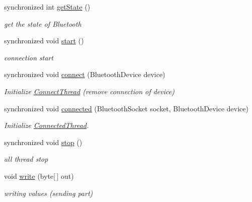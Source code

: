 \begin{DoxyCompactItemize}
synchronized int \mbox{\hyperlink{classhi_1_1world_1_1hello_1_1myapplication_1_1_bluetooth_service_aa33057afe9bc035501a9db0cd842d0d3}{get\+State}} ()
\begin{DoxyCompactList}\small\item\em get the state of Bluetooth \end{DoxyCompactList}\item 
synchronized void \mbox{\hyperlink{classhi_1_1world_1_1hello_1_1myapplication_1_1_bluetooth_service_aa380384e7d6817ad7044afefc7ffa447}{start}} ()
\begin{DoxyCompactList}\small\item\em connection start \end{DoxyCompactList}\item 
synchronized void \mbox{\hyperlink{classhi_1_1world_1_1hello_1_1myapplication_1_1_bluetooth_service_a5af82512cbbc3a5a35ecf015fbb97af3}{connect}} (Bluetooth\+Device device)
\begin{DoxyCompactList}\small\item\em Initialize \mbox{\hyperlink{classhi_1_1world_1_1hello_1_1myapplication_1_1_bluetooth_service_1_1_connect_thread}{Connect\+Thread}} (remove connection of device) \end{DoxyCompactList}\item 
synchronized void \mbox{\hyperlink{classhi_1_1world_1_1hello_1_1myapplication_1_1_bluetooth_service_ab22291b927949cf970eb7a24ab37b27e}{connected}} (Bluetooth\+Socket socket, Bluetooth\+Device device)
\begin{DoxyCompactList}\small\item\em Initialize \mbox{\hyperlink{classhi_1_1world_1_1hello_1_1myapplication_1_1_bluetooth_service_1_1_connected_thread}{Connected\+Thread}}. \end{DoxyCompactList}\item 
synchronized void \mbox{\hyperlink{classhi_1_1world_1_1hello_1_1myapplication_1_1_bluetooth_service_ac2f4c08d272b9426878621463f4c95e9}{stop}} ()
\begin{DoxyCompactList}\small\item\em all thread stop \end{DoxyCompactList}\item 
void \mbox{\hyperlink{classhi_1_1world_1_1hello_1_1myapplication_1_1_bluetooth_service_afa27e71cf7b68afa02e6d912dc6e907c}{write}} (byte\mbox{[}$\,$\mbox{]} out)
\begin{DoxyCompactList}\small\item\em writing values (sending part) \end{DoxyCompactList}\end{DoxyCompactItemize}
